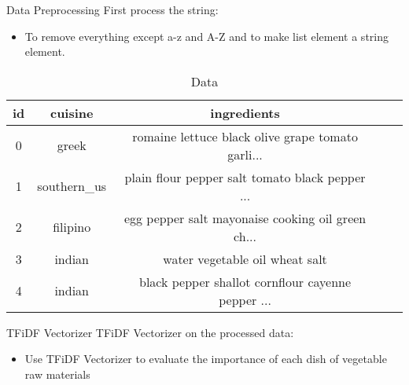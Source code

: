 \documentclass[
 size=14pt,
 paper=smartboard,  %
 mode=present, 		%
 display=slides, 	%
 style=tuliplab,  	%
 pauseslide,
 fleqn,leqno]{powerdot}
\begin{document}
\begin{slide}[toc=,bm=]{Data Preprocessing}
  First process the string:
\begin{itemize}
  \item To remove everything except a-z and A-Z and to make list element a string element. 
\end{itemize}
\begin{table}
  \centering
  \caption{Data}  

\begin{tabular}{c c c c c }
  \hline
  id & cuisine & ingredients \\
  \hline
   0 & greek & romaine lettuce black olive grape tomato garli... \\
   1 & southern_us & plain flour pepper salt tomato black pepper ... \\
   2 & filipino & egg pepper salt mayonaise cooking oil green ch... \\
   3 & indian & water vegetable oil wheat salt \\
   4 & indian & black pepper shallot cornflour cayenne pepper ... \\
 \hline
\end{tabular}
\end{table} 
\end{slide}


\begin{slide}{TFiDF Vectorizer}
  TFiDF Vectorizer on the processed data:
  \begin{itemize}
    \item Use TFiDF Vectorizer to evaluate the importance of each dish of vegetable raw materials \\
  \end{itemize}
 

\end{slide}
\end{document}
